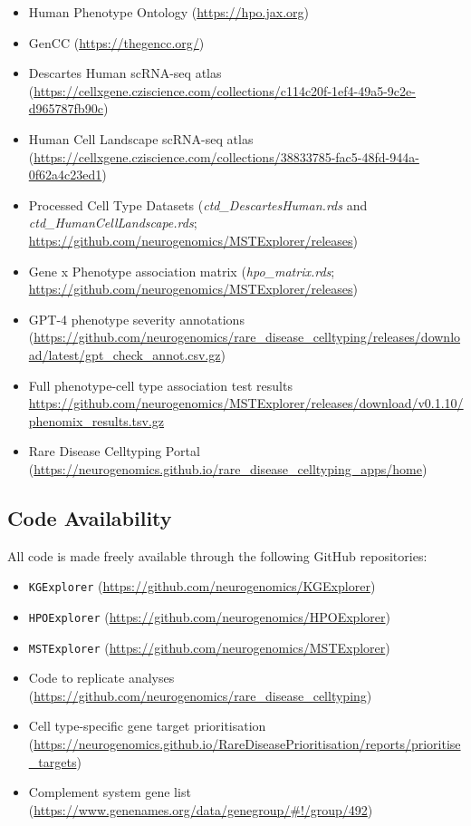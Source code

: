 \documentclass[
]{article}
\providecommand{\tightlist}{%
  \setlength{\itemsep}{0pt}\setlength{\parskip}{0pt}}\usepackage{longtable,booktabs,array}
\begin{document}
\begin{itemize}
\tightlist
\item
  Human Phenotype Ontology (\url{https://hpo.jax.org})
\item
  GenCC (\url{https://thegencc.org/})
\item
  Descartes Human scRNA-seq atlas
  (\url{https://cellxgene.cziscience.com/collections/c114c20f-1ef4-49a5-9c2e-d965787fb90c})
\item
  Human Cell Landscape scRNA-seq atlas
  (\url{https://cellxgene.cziscience.com/collections/38833785-fac5-48fd-944a-0f62a4c23ed1})
\item
  Processed Cell Type Datasets (\emph{ctd\_DescartesHuman.rds} and
  \emph{ctd\_HumanCellLandscape.rds};
  \url{https://github.com/neurogenomics/MSTExplorer/releases})
\item
  Gene x Phenotype association matrix (\emph{hpo\_matrix.rds};
  \url{https://github.com/neurogenomics/MSTExplorer/releases})
\item
  GPT-4 phenotype severity annotations
  (\url{https://github.com/neurogenomics/rare_disease_celltyping/releases/download/latest/gpt_check_annot.csv.gz})
\item
  Full phenotype-cell type association test results
  \url{https://github.com/neurogenomics/MSTExplorer/releases/download/v0.1.10/phenomix_results.tsv.gz}
\item
  Rare Disease Celltyping Portal
  (\url{https://neurogenomics.github.io/rare_disease_celltyping_apps/home})
\end{itemize}

\subsection{Code Availability}\label{code-availability}

All code is made freely available through the following GitHub
repositories:

\begin{itemize}
\tightlist
\item
  \texttt{KGExplorer}
  (\url{https://github.com/neurogenomics/KGExplorer})
\item
  \texttt{HPOExplorer}
  (\url{https://github.com/neurogenomics/HPOExplorer})
\item
  \texttt{MSTExplorer}
  (\url{https://github.com/neurogenomics/MSTExplorer})
\item
  Code to replicate analyses
  (\url{https://github.com/neurogenomics/rare_disease_celltyping})
\item
  Cell type-specific gene target prioritisation
  (\url{https://neurogenomics.github.io/RareDiseasePrioritisation/reports/prioritise_targets})
\item
  Complement system gene list
  (\url{https://www.genenames.org/data/genegroup/\#!/group/492})
\end{itemize}
\end{document}
